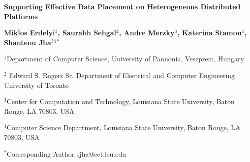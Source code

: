 \documentclass[a4paper,11pt]{article}
\begin{document}
\begin{center}
\textbf{\Large Supporting Effective Data Placement on Heterogeneous Distributed Platforms}


\textbf {\normalsize \hspace{0.6 in} Miklos Erdelyi$^1$, Saurabh Sehgal$^2$, Andre Merzky$^3$,  \newline Katerina Stamou$^4$, Shantenu Jha$^{34*}$ }

\normalsize { \hspace{0.6 in} $^1$Department of Computer Science, University of Pannonia, Veszprem, Hungary}

\normalsize { \hspace{0.6 in} $^2$ Edward S. Rogers Sr. Department of Electrical and Computer Engineering  University of Toronto}

\normalsize { \hspace{0.6 in} $^3$Center for Computation and Technology, \newline Louisiana State University, Baton Rouge, LA 70803, USA}

\normalsize {\hspace{0.6 in} $^4$Computer Science Department, \newline Louisiana State University, Baton Rouge, LA 70803, USA}

{\footnotesize {\hspace{0.0 in} $^*$Corresponding Author sjha@cct.lsu.edu}}

\end{center}

\end{document}
